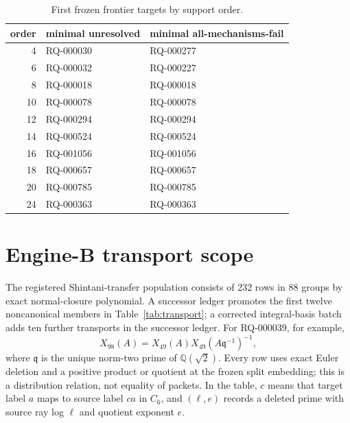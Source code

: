 \documentclass[11pt]{article}
\newcommand{\Q}{\mathbb Q}
\begin{document}
\begin{table}[ht]
\centering
\caption{First frozen frontier targets by support order.}\label{tab:frontier}
\begin{tabular}{rll}\toprule
order & minimal unresolved & minimal all-mechanisms-fail\\\midrule
4 & RQ-000030 & RQ-000277\\
6 & RQ-000032 & RQ-000227\\
8 & RQ-000018 & RQ-000018\\
10 & RQ-000078 & RQ-000078\\
12 & RQ-000294 & RQ-000294\\
14 & RQ-000524 & RQ-000524\\
16 & RQ-001056 & RQ-001056\\
18 & RQ-000657 & RQ-000657\\
20 & RQ-000785 & RQ-000785\\
24 & RQ-000363 & RQ-000363\\\bottomrule
\end{tabular}
\end{table}

\section{Engine-B transport scope}

The registered Shintani-transfer population consists of 232 rows in 88
groups by exact normal-closure polynomial.  A successor ledger promotes
the first twelve noncanonical members in Table~\ref{tab:transport}; a
corrected integral-basis batch adds ten further transports in the
successor ledger.
For RQ-000039, for example,
\[
 X_{98}(A)=X_{49}(A)X_{49}(A\mathfrak q^{-1})^{-1},
\]
where $\mathfrak q$ is the unique norm-two prime of $\Q(\sqrt2)$.
Every row uses exact Euler deletion and a positive product or quotient
at the frozen split embedding; this is a distribution relation, not
equality of packets.  In the table, $c$ means that target label $a$
maps to source label $ca$ in $C_6$, and $(\ell,e)$ records a deleted
prime with source ray log $\ell$ and quotient exponent $e$.
\end{document}
